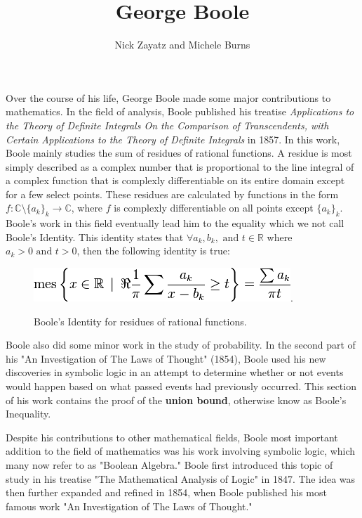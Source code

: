 \documentclass[12]{article} %
\title{George Boole}
\author{Nick Zayatz and Michele Burns}
\begin{document}
\maketitle %

Over the course of his life, George Boole made some major contributions to mathematics. In the field of analysis, Boole published his treatise \textit{Applications to the Theory of Definite Integrals On the Comparison of Transcendents, with Certain Applications to the Theory of Definite Integrals} in 1857. In this work, Boole mainly studies the sum of residues of rational functions. A residue is most simply described as a complex number that is proportional to the line integral of a complex function that is complexly differentiable on its entire domain except for a few select points. These residues are calculated by functions in the form $f: \mathbb{C}\setminus \{a_{k}\}_{k} \rightarrow \mathbb{C}$, where $f$ is complexly differentiable on all points except $\{a_{k}\}_{k}$. Boole's work in this field eventually lead him to the equality which we not call Boole's Identity. This identity states that $\forall a_{k},b_{k}, \text{ and } t \in \mathbb{R}$ where $a_{k} > 0 \text{ and } t > 0$, then the following identity is true:

\begin{figure}[H]
\centerline{\includegraphics[scale=0.8]{boolesIdentity}.}
\caption{Boole's Identity for residues of rational functions.}\label{fig1}
\end{figure}

Boole also did some minor work in the study of probability. In the second part of his "An Investigation of The Laws of Thought" (1854), Boole used his new discoveries in symbolic logic in an attempt to determine whether or not events would happen based on what passed events had previously occurred. This section of his work contains the proof of the \textbf{union bound}, otherwise know as Boole's Inequality.

Despite his contributions to other mathematical fields, Boole most important addition to the field of mathematics was his work involving symbolic logic, which many now refer to as "Boolean Algebra." Boole first introduced this topic of study in his treatise "The Mathematical Analysis of Logic" in 1847. The idea was then further expanded and refined in 1854, when Boole published his most famous work "An Investigation of The Laws of Thought."
\end{document}
